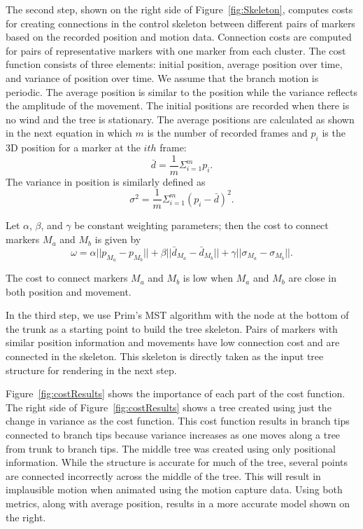 The second step, shown on the right side of Figure~\ref{fig:Skeleton}, computes costs for creating connections in the control skeleton between different pairs of markers based on the recorded position and motion data. Connection costs are computed for pairs of representative markers with one marker from each cluster. The cost function consists of three elements: initial position, average position over time, and variance of position over time. We assume that the branch motion is periodic. The  average position is similar to the position while the variance reflects the amplitude of the movement. The initial positions are recorded when there is no wind and the tree is stationary. The average positions are calculated as shown in the next equation in which $m$ is the number of recorded frames and $p_i$ is the 3D position for a marker at the $ith$ frame: 
\[
	   \bar{d} = \frac{1}{m}\Sigma_{i=1}^m p_i.
\]
The variance in position is similarly defined as 
\[
      \sigma^2 = \frac{1}{m}\Sigma_{i=1}^m (p_i-\bar{d})^2.
\] 

Let $\alpha$, $\beta$, and $\gamma$ be constant weighting parameters; then the cost to connect markers $M_a$ and $M_b$ is given by
\[
      \omega = \alpha||p_{M_a} - p_{M_b}|| + \beta||\bar{d}_{M_a} - \bar{d}_{M_b}|| + \gamma||\sigma_{M_a} - \sigma_{M_b}||. 
\]

The cost to connect markers $M_a$ and $M_b$ is low when $M_a$ and $M_b$ are close in both position and movement.

In the third step, we use Prim's MST algorithm with the node at the bottom of the trunk as a starting point to build the tree skeleton. Pairs of markers with similar position information and movements have low connection cost and are connected in the skeleton. This skeleton is directly taken as the input tree structure for rendering in the next step.    

Figure~\ref{fig:costResults} shows the importance of each part of the cost function. The right side of Figure~\ref{fig:costResults} shows a tree created using just the change in variance as the cost function. This cost function results in branch tips connected to branch tips because variance increases as one moves along a tree from trunk to branch tips. The middle tree was created using only positional information.  While the structure is accurate for much of the tree, several points are connected incorrectly across the middle of the tree. This will result in implausible motion when animated using the motion capture data. Using both metrics, along with average position, results in a more accurate model shown on the right.  

